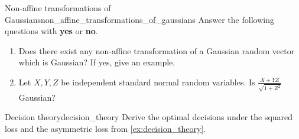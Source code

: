 \begin{nexercise}{Non-affine transformations of Gaussians}{non_affine_transformations_of_gaussians}
  Answer the following questions with \textbf{yes} or \textbf{no}.
  \begin{enumerate}
    \item Does there exist any non-affine transformation of a Gaussian random vector which is Gaussian? If yes, give an example.
    \item Let $X, Y, Z$ be independent standard normal random variables. Is $\frac{X + YZ}{\sqrt{1 + Z^2}}$ Gaussian?
  \end{enumerate}
\end{nexercise}

\begin{nexercise}{Decision theory}{decision_theory}
  Derive the optimal decisions under the squared loss and the asymmetric loss from \cref{ex:decision_theory}.
\end{nexercise}
